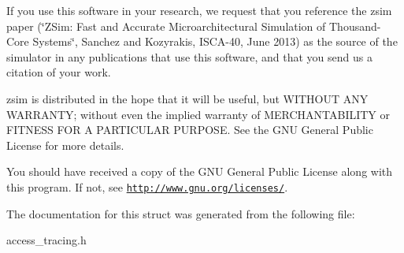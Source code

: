 If you use this software in your research, we request that you reference the zsim paper (\char`\"{}\-Z\-Sim\-: Fast and Accurate Microarchitectural Simulation of
\-Thousand-\/\-Core Systems\char`\"{}, Sanchez and Kozyrakis, I\-S\-C\-A-\/40, June 2013) as the source of the simulator in any publications that use this software, and that you send us a citation of your work.

zsim is distributed in the hope that it will be useful, but W\-I\-T\-H\-O\-U\-T A\-N\-Y W\-A\-R\-R\-A\-N\-T\-Y; without even the implied warranty of M\-E\-R\-C\-H\-A\-N\-T\-A\-B\-I\-L\-I\-T\-Y or F\-I\-T\-N\-E\-S\-S F\-O\-R A P\-A\-R\-T\-I\-C\-U\-L\-A\-R P\-U\-R\-P\-O\-S\-E. See the G\-N\-U General Public License for more details.

You should have received a copy of the G\-N\-U General Public License along with this program. If not, see \href{http://www.gnu.org/licenses/}{\tt http\-://www.\-gnu.\-org/licenses/}. 

The documentation for this struct was generated from the following file\-:\begin{DoxyCompactItemize}
\item 
access\-\_\-tracing.\-h\end{DoxyCompactItemize}
